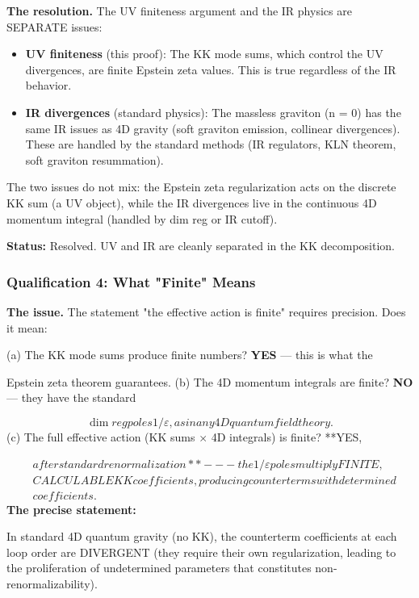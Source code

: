 \documentclass[aps,prd,preprint,superscriptaddress,longbibliography,floatfix]{revtex4-2}
\theoremstyle{remark}
\begin{document}
\textbf{The resolution.} The UV finiteness argument and the IR physics are SEPARATE issues:


\begin{itemize}
  \item \textbf{UV finiteness} (this proof): The KK mode sums, which control the UV divergences, are finite Epstein zeta values. This is true regardless of the IR behavior.
  \item \textbf{IR divergences} (standard physics): The massless graviton (n = 0) has the same IR issues as 4D gravity (soft graviton emission, collinear divergences). These are handled by the standard methods (IR regulators, KLN theorem, soft graviton resummation).
\end{itemize}

The two issues do not mix: the Epstein zeta regularization acts on the discrete KK sum (a UV object), while the IR divergences live in the continuous 4D momentum integral (handled by dim reg or IR cutoff).

\textbf{Status:} Resolved. UV and IR are cleanly separated in the KK decomposition.


\subsubsection{Qualification 4: What "Finite" Means}

\textbf{The issue.} The statement "the effective action is finite" requires precision. Does it mean:

(a) The KK mode sums produce finite numbers? \textbf{YES} --- this is what the

Epstein zeta theorem guarantees.
(b) The 4D momentum integrals are finite? \textbf{NO} --- they have the standard

\begin{equation}
    \dim reg poles 1/\varepsilon, as in any 4D quantum field theory.
\end{equation}
(c) The full effective action (KK sums $\times$ 4D integrals) is finite? **YES,

\begin{align}
    & after standard renormalization** --- the 1/\varepsilon poles multiply FINITE, \\
    & CALCULABLE KK coefficients, producing counterterms with determined \\
    & coefficients.
\end{align}
\textbf{The precise statement:}

In standard 4D quantum gravity (no KK), the counterterm coefficients at each loop order are DIVERGENT (they require their own regularization, leading to the proliferation of undetermined parameters that constitutes non-renormalizability).
\end{document}
